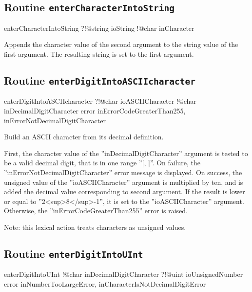 \subsection{Routine \texttt{enterCharacterIntoString}}

\begin{galgas}
enterCharacterIntoString ?!@string ioString
                         !@char inCharacter
\end{galgas}

Appends the character value of the second argument to the string value of the first argument. The resulting string is set to the first argument.

\subsection{Routine \texttt{enterDigitIntoASCIIcharacter}}

\begin{galgas}
enterDigitIntoASCIIcharacter ?!@char ioASCIICharacter
                             !@char inDecimalDigitCharacter
                             error inErrorCodeGreaterThan255,
                                   inErrorNotDecimalDigitCharacter
\end{galgas}

Build an ASCII character from its decimal definition.

First, the character value of the ''inDecimalDigitCharacter'' argument is tested to be a valid decimal digit, that is in one range ''[\textquotesingle, \textquotesingle]''. On failure, the ''inErrorNotDecimalDigitCharacter'' error message is displayed. On success, the unsigned value of the ''ioASCIICharacter'' argument is multiplied by ten, and is added the decimal value corresponding to second argument. If the result is lower or equal to ''2<sup>8</sup>-1'', it is set to the ''ioASCIICharacter'' argument. Otherwise, the ''inErrorCodeGreaterThan255'' error is raised.

Note: this lexical action treats characters as unsigned values.

\subsection{Routine \texttt{enterDigitIntoUInt}}

\begin{galgas}
enterDigitIntoUInt !@char inDecimalDigitCharacter
                   ?!@uint ioUnsignedNumber
                   error inNumberTooLargeError,
                         inCharacterIsNotDecimalDigitError
\end{galgas}

